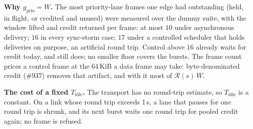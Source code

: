 \documentclass[journal]{IEEEtran}
\newcommand{\Rg}{\mathcal{R}}
\newcommand{\issue}[1]{\#{#1}}
\begin{document}
\textbf{Why $g_{\mathrm{prio}}=W$.}  The most priority-lane frames one edge had outstanding
(held, in flight, or credited and unused) were measured over the dummy suite, with the window
lifted and credit returned per frame: at most $10$ under asynchronous delivery; $16$ in every
sync-storm case; $17$ under a controlled scheduler that holds deliveries on purpose, an
artificial round trip.  Control above $16$ already waits for credit today, and still does; no
smaller floor covers the bursts.  The frame count prices a control frame at the 64\,KiB a data
frame may take: byte-denominated credit (\issue{937}) removes that artifact, and with it most
of $\Rg(s)\,W$.

\textbf{The cost of a fixed $T_{\mathrm{idle}}$.}  The transport has no round-trip estimate,
so $T_{\mathrm{idle}}$ is a constant.  On a link whose round trip exceeds 1\,s, a lane that
pauses for one round trip is shrunk, and its next burst waits one round trip for pooled credit
again; no frame is refused.
\end{document}
